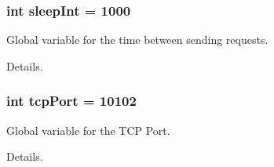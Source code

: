 \subsubsection[{\texorpdfstring{sleep\+Int}{sleepInt}}]{\setlength{\rightskip}{0pt plus 5cm}int sleep\+Int = 1000}\hypertarget{simple-iec61850-client_8c_a7c0b25939579bd308b11966fb04288e0}{}\label{simple-iec61850-client_8c_a7c0b25939579bd308b11966fb04288e0}


Global variable for the time between sending requests. 

Details. 
\subsubsection[{\texorpdfstring{tcp\+Port}{tcpPort}}]{\setlength{\rightskip}{0pt plus 5cm}int tcp\+Port = 10102}\hypertarget{simple-iec61850-client_8c_ac31354d08316076b496efb2b3a2c69e6}{}\label{simple-iec61850-client_8c_ac31354d08316076b496efb2b3a2c69e6}


Global variable for the T\+CP Port. 

Details. 